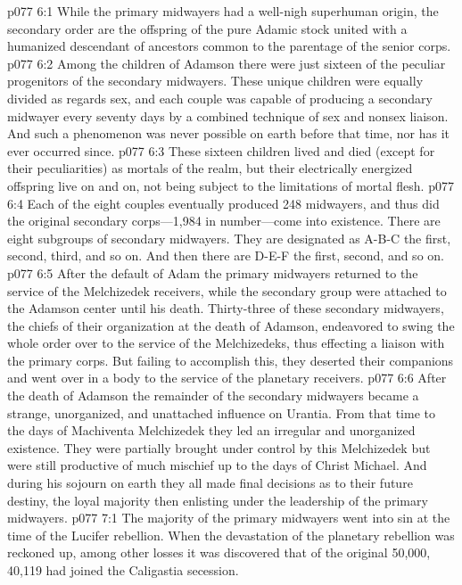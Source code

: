 \vs p077 6:1 While the primary midwayers had a well\hyp{}nigh superhuman origin, the secondary order are the offspring of the pure Adamic stock united with a humanized descendant of ancestors common to the parentage of the senior corps.
\vs p077 6:2 Among the children of Adamson there were just sixteen of the peculiar progenitors of the secondary midwayers. These unique children were equally divided as regards sex, and each couple was capable of producing a secondary midwayer every seventy days by a combined technique of sex and nonsex liaison. And such a phenomenon was never possible on earth before that time, nor has it ever occurred since.\plusone
\vs p077 6:3 These sixteen children lived and died (except for their peculiarities) as mortals of the realm, but their electrically energized offspring live on and on, not being subject to the limitations of mortal flesh.
\vs p077 6:4 Each of the eight couples eventually produced 248 midwayers, and thus did the original secondary corps---1,984 in number---come into existence. There are eight subgroups of secondary midwayers. They are designated as A\hyp{}B\hyp{}C the first, second, third, and so on. And then there are D\hyp{}E\hyp{}F the first, second, and so on.
\pc \vs p077 6:5 After the default of Adam the primary midwayers returned to the service of the Melchizedek receivers, while the secondary group were attached to the Adamson center until his death. Thirty\hyp{}three of these secondary midwayers, the chiefs of their organization at the death of Adamson, endeavored to swing the whole order over to the service of the Melchizedeks, thus effecting a liaison with the primary corps. But failing to accomplish this, they deserted their companions and went over in a body to the service of the planetary receivers.
\vs p077 6:6 After the death of Adamson the remainder of the secondary midwayers became a strange, unorganized, and unattached influence on Urantia. From that time to the days of Machiventa Melchizedek they led an irregular and unorganized existence. They were partially brought under control by this Melchizedek but were still productive of much mischief up to the days of Christ Michael. And during his sojourn on earth they all made final decisions as to their future destiny, the loyal majority then enlisting under the leadership of the primary midwayers.
\vs p077 7:1 The majority of the primary midwayers went into sin at the time of the Lucifer rebellion. When the devastation of the planetary rebellion was reckoned up, among other losses it was discovered that of the original 50,000, 40,119 had joined the Caligastia secession.
